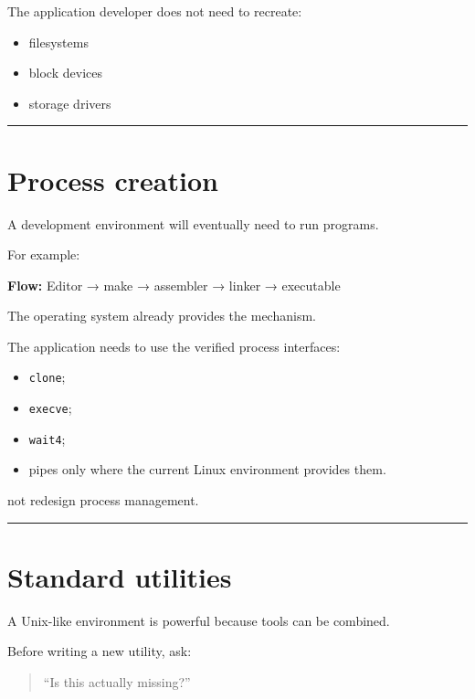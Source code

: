 \documentclass[
  oneside,
  openany]{book}
\providecommand{\tightlist}{%
  \setlength{\itemsep}{0pt}\setlength{\parskip}{0pt}}
\begin{document}
The application developer does not need to recreate:

\begin{itemize}
\tightlist
\item
  filesystems
\item
  block devices
\item
  storage drivers
\end{itemize}

\begin{center}\rule{0.5\linewidth}{0.5pt}\end{center}

\hypertarget{process-creation}{%
\section{Process creation}\label{process-creation}}

A development environment will eventually need to run programs.

For example:

\textbf{Flow:} Editor → make → assembler → linker → executable

The operating system already provides the mechanism.

The application needs to use the verified process interfaces:

\begin{itemize}
\tightlist
\item
  \texttt{clone};
\item
  \texttt{execve};
\item
  \texttt{wait4};
\item
  pipes only where the current Linux environment provides them.
\end{itemize}

not redesign process management.

\begin{center}\rule{0.5\linewidth}{0.5pt}\end{center}

\hypertarget{standard-utilities}{%
\section{Standard utilities}\label{standard-utilities}}

A Unix-like environment is powerful because tools can be combined.

Before writing a new utility, ask:

\begin{quote}
``Is this actually missing?''
\end{quote}
\end{document}
